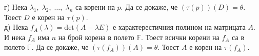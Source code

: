 \documentclass[a4paper, 12pt, oneside]{article}
\begin{document}
г) Нека \(\lambda_1, \; \lambda_2, \; \dots, \; \lambda_n\) са корени на \(p\).
Да се докаже, че \((\tau(p))(D) = \theta\). Тоест \(D\) е корен на \(\tau(p)\). \\
д) Нека \(f_A(\lambda) = \mathrm{det}(A - \lambda E)\) е характерестичния полином на матрицата \(A\). \\
И нека \(f_A\) има \(n\) на брой корена в полето \(\mathbb{F}\).
Тоест всички корени на \(f_A\) са в полето \(\mathbb{F}\). Да се докаже, че
\((\tau(f_A))(A) = \theta\). Тоест \(A\) е корен на \(\tau(f_A)\).
\end{document}
